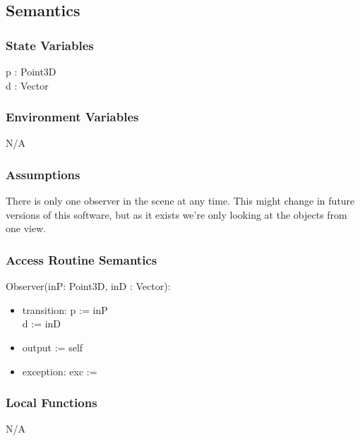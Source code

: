 \documentclass[12pt, titlepage]{article}
\begin{document}

\subsection{Semantics}
\subsubsection{State Variables}
p : Point3D\\
d : Vector\\

\subsubsection{Environment Variables}
N/A

\subsubsection{Assumptions}
There is only one observer in the scene at any time. This might change in 
future versions of this software, but as it exists we're only looking at the 
objects from one view.

\subsubsection{Access Routine Semantics}
\noindent Observer(inP: Point3D, inD : Vector):
\begin{itemize}
	\item transition: p := inP \\
	d := inD
	\item output := self
	\item exception: exc := 
\end{itemize}

\subsubsection{Local Functions}
N/A
\end{document}
